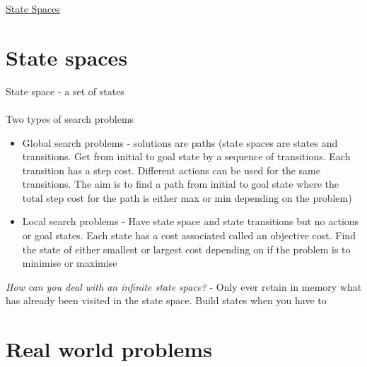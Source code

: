 \documentclass{article}[18pt]
\begin{document}
\begin{center}
\underline{\huge State Spaces}
\end{center}
\section{State spaces}
State space - a set of states\\
\\
Two types of search problems
\begin{itemize}
	\item Global search problems - solutions are paths (state spaces are states and transitions. Get from initial to goal state by a sequence of transitions. Each transition has a step cost. Different actions can be used for the same transitions. The aim is to find a path from initial to goal state where the total step cost for the path is either max or min depending on the problem)
	\item Local search problems - Have state space and state transitions but no actions or goal states. Each state has a cost associated called an objective cost. Find the state of either smallest or largest cost depending on if the problem is to minimise or maximise
\end{itemize}
\textit{How can you deal with an infinite state space?} - Only ever retain in memory what has already been visited in the state space. Build states when you have to
\section{Real world problems}
\end{document}

